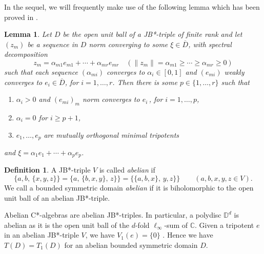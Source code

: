 \documentclass[12pt, twoside]{article}
\newtheorem{lemma}[theorem]{Lemma}
\theoremstyle{definition}
\newtheorem{definition}[theorem]{Definition}
\numberwithin{equation}{section}
\begin{document}
In the sequel, we will frequently make use of the following lemma which has been proved in
\cite[Lemma 5.8]{horo}.
\begin{lemma}\label{zmm} Let $D$ be the open unit ball of a JB*-triple of finite rank and let
$(z_m)$ be a sequence in $D$ norm converging to some $\xi \in \overline D$, with spectral
decomposition
$$z_m =  \alpha_{m1}e_{m1} + \cdots + \alpha_{mr}e_{mr} \quad (\|z_m\| = \alpha_{m1} \geq \cdots \geq \alpha_{mr}\geq 0)$$
such that each sequence $( \alpha_{mi})$ converges to $\alpha_i\in [0,1] $
and  $(e_{mi})$
 weakly converges to $e_i\in \overline D$, for $i=1, \ldots, r$.
Then there is some $p\in \{1, \ldots, r\}$ such that
\begin{enumerate}
\item[(i)] $\alpha_i >0$ and $(e_{mi})_m$ norm converges to $e_i\,$, for $i = 1, \ldots, p$,
\item[(ii)] $\alpha_i=0$ for $i \geq p+1$,
\item[(iii)]$e_1, \ldots, e_p$ are mutually orthogonal minimal tripotents
\end{enumerate}
and $\xi = \alpha_1 e_1 + \cdots + \alpha_p e_p$.
\end{lemma}


\begin{definition}\label{abelian}
A JB*-triple $V$ is called {\it abelian} if
$$\{a,b,\,\{x,y,z\}\} =\{a,\,\{b,x,y\},\, z\}\} =\{\{a,b,x\},\, y,z\}\}  \qquad (a,b,x,y,z \in V).$$
We call a bounded symmetric domain {\it abelian} if it is biholomorphic to the open unit ball of
an abelian JB*-triple.
\end{definition}

Abelian C*-algebras are abelian JB*-triples. In particular, a polydisc
$\mathbb{D}^d$ is abelian as it is the open unit ball of the $d$-fold $\ell_\infty$-sum of $\mathbb{C}$.
Given a tripotent $e$ in an abelian JB*-triple $V$, we have $V_1(e)=\{0\}$ \cite[Lemma 1.2.38]{book}.
Hence we have $T(D)=T_1(D)$ for an abelian bounded symmetric domain $D$.
\end{document}
